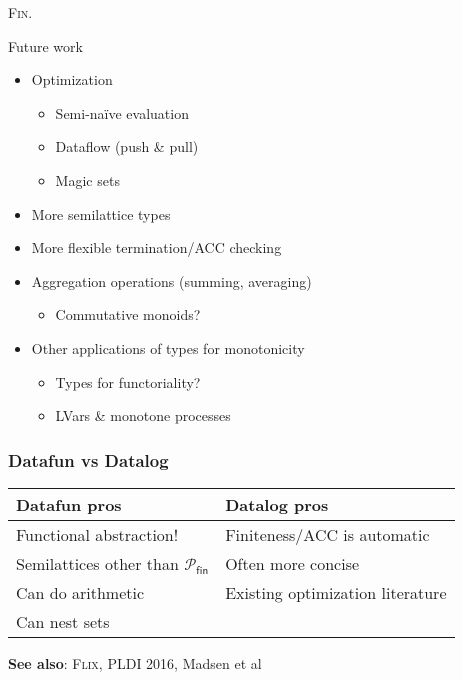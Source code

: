 \documentclass{beamer}
\newcommand{\ms}{\mathsf}
\begin{document}

\begin{frame}
  \centering \Huge \textsc{Fin.}
\end{frame}

\begin{frame}{Future work}\large
  \begin{itemize}
  \item Optimization
    \begin{itemize}\normalsize
    \item Semi-na\"ive evaluation
    \item Dataflow (push \& pull)
    \item Magic sets
    \end{itemize}
  \item More semilattice types
  \item More flexible termination/ACC checking
  \item Aggregation operations (summing, averaging)
    \begin{itemize}\normalsize
    \item Commutative monoids?
    \end{itemize}
  \item Other applications of types for monotonicity
    \begin{itemize}\normalsize
    \item Types for functoriality?
    \item LVars \& monotone processes
    \end{itemize}
  \end{itemize}
\end{frame}

\begin{frame}
  \frametitle{Datafun vs Datalog}

  \begin{center}
    \begin{tabular}{l|l}
      \textbf{Datafun pros} & \textbf{Datalog pros}\\\hline
      Functional abstraction! & Finiteness/ACC is automatic\\
      Semilattices other than $\mathcal{P}_{\ms{fin}}$ & Often more concise\\
      Can do arithmetic & Existing optimization literature\\
      Can nest sets
    \end{tabular}
  \end{center}

  \vspace{2em}

  \textbf{See also}: \textsc{Flix}, PLDI 2016, Madsen et al
\end{frame}
\end{document}
